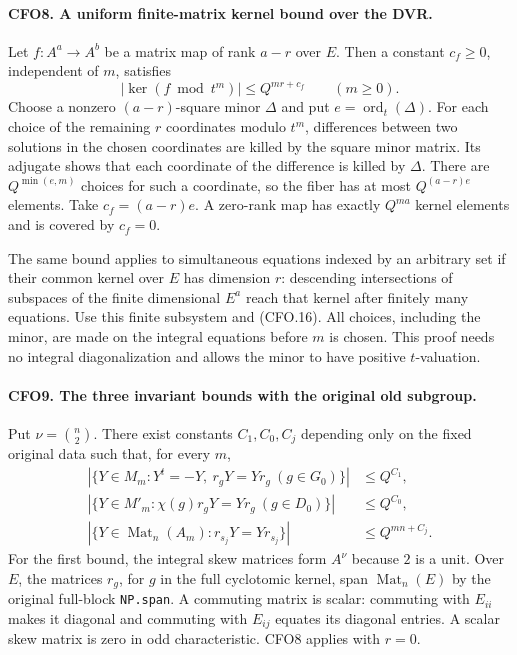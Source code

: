 \paragraph{CFO8. A uniform finite-matrix kernel bound over the DVR.}
\label{claim:CFO8}
Let $f:A^a\to A^b$ be a matrix map of rank $a-r$ over $E$.
Then a constant $c_f\ge0$, independent of $m$, satisfies
\[
 |\ker(f\bmod t^m)|\le Q^{mr+c_f}\qquad(m\ge0).                 \tag{CFO.16}
\]
Choose a nonzero $(a-r)$-square minor $\Delta$ and put
$e=\operatorname{ord}_t(\Delta)$.  For each choice of the
remaining $r$ coordinates modulo $t^m$, differences between
two solutions in the chosen coordinates are killed by the
square minor matrix.  Its adjugate shows that each coordinate
of the difference is killed by $\Delta$.  There are
$Q^{\min(e,m)}$ choices for such a coordinate, so the fiber
has at most $Q^{(a-r)e}$ elements.  Take
$c_f=(a-r)e$.  A zero-rank map has exactly $Q^{ma}$ kernel
elements and is covered by $c_f=0$.

The same bound applies to simultaneous equations indexed by
an arbitrary set if their common kernel over $E$ has dimension
$r$: descending intersections of subspaces of the finite
dimensional $E^a$ reach that kernel after finitely many
equations.  Use this finite subsystem and (CFO.16).  All
choices, including the minor, are made on the integral
equations before $m$ is chosen.  This proof needs no integral
diagonalization and allows the minor to have positive
$t$-valuation.

\paragraph{CFO9. The three invariant bounds with the original old subgroup.}
\label{claim:CFO9}
Put $\nu=\binom n2$.  There exist constants $C_1,C_0,C_j$
depending only on the fixed original data such that, for every
$m$,
\[
 \begin{split}
 |\{Y\in M_m:Y^t=-Y,\ r_gY=Yr_g\ (g\in G_0)\}|&\le Q^{C_1},\\
 |\{Y\in M'_m:\chi(g)r_gY=Yr_g\ (g\in D_0)\}|&\le Q^{C_0},\\
 |\{Y\in\operatorname{Mat}_n(A_m):r_{s_j}Y=Yr_{s_j}\}|
       &\le Q^{mn+C_j}. 
 \end{split}                                                     \tag{CFO.17}
\]
For the first bound, the integral skew matrices form $A^\nu$
because $2$ is a unit.  Over $E$, the matrices $r_g$, for
$g$ in the full cyclotomic kernel, span
$\operatorname{Mat}_n(E)$ by the original full-block
\texttt{NP.span}.  A commuting matrix is scalar: commuting
with $E_{ii}$ makes it diagonal and commuting with $E_{ij}$
equates its diagonal entries.  A scalar skew matrix is zero
in odd characteristic.  CFO8 applies with $r=0$.


